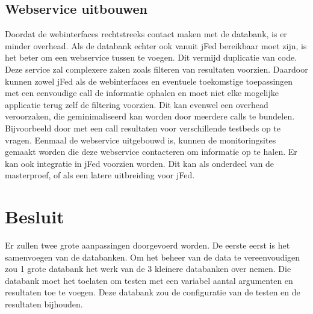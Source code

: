 \subsection{Webservice uitbouwen}
\npar
Doordat de webinterfaces rechtstreeks contact maken met de databank, is er minder overhead. Als de databank echter ook vanuit jFed bereikbaar moet zijn, is het beter om een webservice tussen te voegen. Dit vermijd duplicatie van code. Deze service zal complexere zaken zoals filteren van resultaten voorzien. Daardoor kunnen zowel jFed als de webinterfaces en eventuele toekomstige toepassingen met een eenvoudige call de informatie ophalen en moet niet elke mogelijke applicatie terug zelf de filtering voorzien. Dit kan evenwel een overhead veroorzaken, die geminimaliseerd kan worden door meerdere calls te bundelen. Bijvoorbeeld door met een call resultaten voor verschillende testbeds op te vragen.
\npar
Eenmaal de webservice uitgebouwd is, kunnen de monitoringsites gemaakt worden die deze webservice contacteren om informatie op te halen. Er kan ook integratie in jFed voorzien worden. Dit kan als onderdeel van de masterproef, of als een latere uitbreiding voor jFed.

\section{Besluit}
\npar
Er zullen twee grote aanpassingen doorgevoerd worden. De eerste eerst is het samenvoegen van de databanken. Om het beheer van de data te vereenvoudigen zou 1 grote databank het werk van de 3 kleinere databanken over nemen. Die databank moet het toelaten om testen met een variabel aantal argumenten en resultaten toe te voegen. Deze databank zou de configuratie van de testen en de resultaten bijhouden.